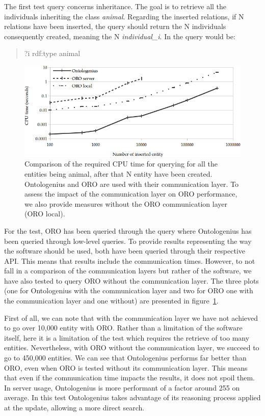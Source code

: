 The first test query concerns inheritance. The goal is to retrieve all the individuals inheriting the class \textit{animal}. Regarding the inserted relations, if N relations have been inserted, the query should return the N individuals consequently created, meaning the N \textit{individual\_i}. In \sparql{} the query would be:

\begin{quote} 
\centering 
?i rdf:type animal
\end{quote}

\begin{figure}[ht!]
\centering
\includegraphics[width=\textwidth]{figures/chapter2/oro/R1.png}
\caption{\label{fig:chap2_oro_r1}Comparison of the required CPU time for querying for all the entities being animal, after that N entity have been created. Ontologenius and ORO are used with their communication layer. To assess the impact of the communication layer on ORO performance, we also provide measures without the ORO communication layer (ORO local).}
\end{figure}

For the test, ORO has been queried through the \sparql{} query where Ontologenius has been queried through low-level queries. To provide results representing the way the software should be used, both have been queried through their respective API. This means that results include the communication times. However, to not fall in a comparison of the communication layers but rather of the software, we have also tested to query ORO without the communication layer. The three plots (one for Ontologenius with the communication layer and two for ORO one with the communication layer and one without) are presented in figure~\ref{fig:chap2_oro_r1}.

First of all, we can note that with the communication layer we have not achieved to go over 10,000 entity with ORO. Rather than a limitation of the software itself, here it is a limitation of the test which requires the retrieve of too many entities. Nevertheless, with ORO without the communication layer, we succeed to go to 450,000 entities. We can see that Ontologenius performs far better than ORO, even when ORO is tested without its communication layer. This means that even if the communication time impacts the results, it does not spoil them. In server usage, Ontologenius is more performant of a factor around 255 on average. In this test Ontologenius takes advantage of its reasoning process applied at the update, allowing a more direct search.

